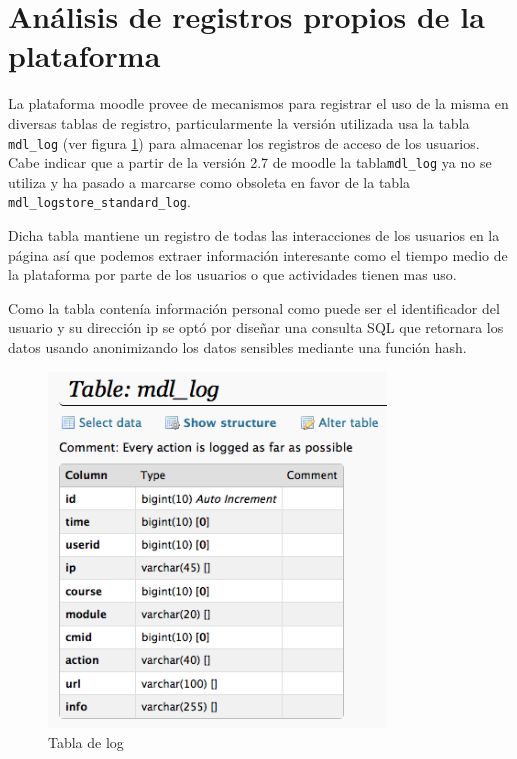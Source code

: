 \section{Análisis de registros propios de la plataforma}

La plataforma moodle provee de mecanismos para registrar el uso de la misma en diversas tablas de registro, particularmente la versión utilizada usa la tabla \texttt{mdl\_log} (ver figura \ref{logtable}) para almacenar los registros de acceso de los usuarios. Cabe indicar que a partir de la versión 2.7 de moodle la tabla\texttt{mdl\_log}  ya no se utiliza y ha pasado a marcarse como obsoleta\cite{art_09} en favor de la tabla \texttt{mdl\_logstore\_standard\_log}.

Dicha tabla mantiene un registro de todas las interacciones de los usuarios en la página así que podemos extraer información interesante como el tiempo medio de la plataforma por parte de los usuarios o que actividades tienen mas uso. 

Como la tabla contenía información personal como puede ser el identificador del usuario y su dirección ip se optó por diseñar una consulta SQL que retornara los datos usando anonimizando los datos sensibles mediante una función hash.

\begin{figure}\centering\includegraphics[width=0.8\textwidth]{../images/logtable}\caption{Tabla de log}\label{logtable}\end{figure}

